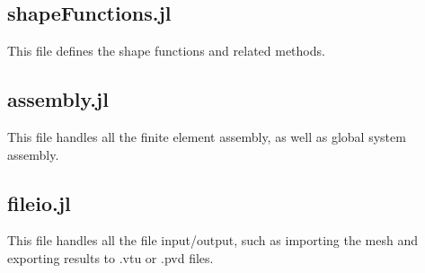 \subsection*{shapeFunctions.jl}
This file defines the shape functions and related methods.


\subsection*{assembly.jl}
This file handles all the finite element assembly, as well as global system assembly.


\subsection*{fileio.jl}
This file handles all the file input/output, such as importing the mesh and exporting results to .vtu or .pvd files.
